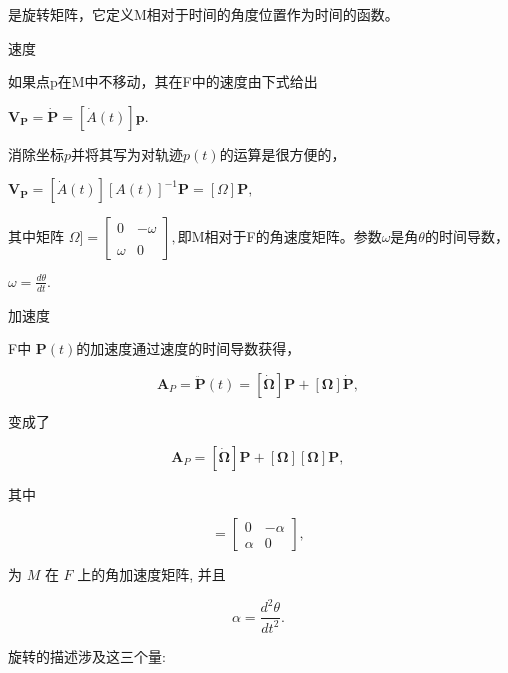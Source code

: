 是旋转矩阵，它定义M相对于时间的角度位置作为时间的函数。

速度

如果点p在M中不移动，其在F中的速度由下式给出

$\mathbf{V_P} = \dot{\mathbf{P}} = [\dot{A}(t)]\mathbf{p}.$

消除坐标$p$并将其写为对轨迹$p(t)$的运算是很方便的，

$\mathbf{V_P} = [\dot{A}(t)][A(t)]^{-1}\mathbf{P} = [\Omega]\mathbf{P},$

其中矩阵 $\Omega] = \begin{bmatrix}0 & -\omega \\\\\omega & 0\end{bmatrix},$即M相对于F的角速度矩阵。参数$\omega$是角$\theta$的时间导数，

$\omega = \frac{d\theta}{dt}.$

加速度

F中  $\mathbf{P}(t)$的加速度通过速度的时间导数获得，

\begin{equation}
\mathbf{A}_P = \ddot{\mathbf{P}}(t) = [\dot{\mathbf{\Omega}}] \mathbf{P} + [\mathbf{\Omega}] \dot{\mathbf{P}},~
\end{equation}

变成了

\begin{equation}
\mathbf{A}_P = [\dot{\mathbf{\Omega}}] \mathbf{P} + [\mathbf{\Omega}][\mathbf{\Omega}] \mathbf{P},~
\end{equation}

其中

\begin{equation}
[\dot{\mathbf{\Omega}}] = 
\begin{bmatrix}
0 & -\alpha \\
\alpha & 0
\end{bmatrix},~
\end{equation}

为 $M$ 在 $F$ 上的角加速度矩阵, 并且

\begin{equation}
\alpha = \frac{d^2 \theta}{dt^2}.~
\end{equation}

旋转的描述涉及这三个量:

